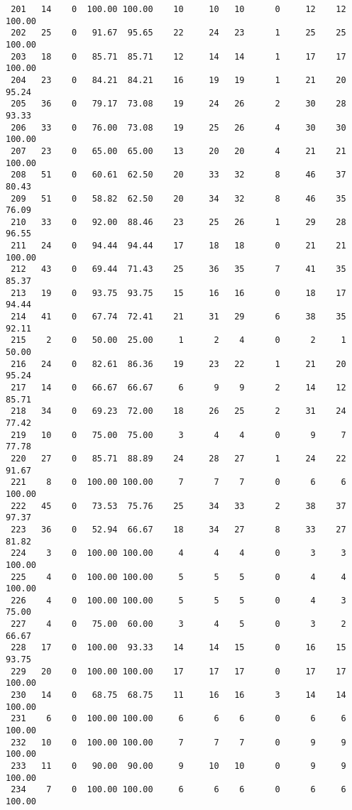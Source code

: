 \begin{verbatim}
 201   14    0  100.00 100.00    10     10   10      0     12    12   100.00
 202   25    0   91.67  95.65    22     24   23      1     25    25   100.00
 203   18    0   85.71  85.71    12     14   14      1     17    17   100.00
 204   23    0   84.21  84.21    16     19   19      1     21    20    95.24
 205   36    0   79.17  73.08    19     24   26      2     30    28    93.33
 206   33    0   76.00  73.08    19     25   26      4     30    30   100.00
 207   23    0   65.00  65.00    13     20   20      4     21    21   100.00
 208   51    0   60.61  62.50    20     33   32      8     46    37    80.43
 209   51    0   58.82  62.50    20     34   32      8     46    35    76.09
 210   33    0   92.00  88.46    23     25   26      1     29    28    96.55
 211   24    0   94.44  94.44    17     18   18      0     21    21   100.00
 212   43    0   69.44  71.43    25     36   35      7     41    35    85.37
 213   19    0   93.75  93.75    15     16   16      0     18    17    94.44
 214   41    0   67.74  72.41    21     31   29      6     38    35    92.11
 215    2    0   50.00  25.00     1      2    4      0      2     1    50.00
 216   24    0   82.61  86.36    19     23   22      1     21    20    95.24
 217   14    0   66.67  66.67     6      9    9      2     14    12    85.71
 218   34    0   69.23  72.00    18     26   25      2     31    24    77.42
 219   10    0   75.00  75.00     3      4    4      0      9     7    77.78
 220   27    0   85.71  88.89    24     28   27      1     24    22    91.67
 221    8    0  100.00 100.00     7      7    7      0      6     6   100.00
 222   45    0   73.53  75.76    25     34   33      2     38    37    97.37
 223   36    0   52.94  66.67    18     34   27      8     33    27    81.82
 224    3    0  100.00 100.00     4      4    4      0      3     3   100.00
 225    4    0  100.00 100.00     5      5    5      0      4     4   100.00
 226    4    0  100.00 100.00     5      5    5      0      4     3    75.00
 227    4    0   75.00  60.00     3      4    5      0      3     2    66.67
 228   17    0  100.00  93.33    14     14   15      0     16    15    93.75
 229   20    0  100.00 100.00    17     17   17      0     17    17   100.00
 230   14    0   68.75  68.75    11     16   16      3     14    14   100.00
 231    6    0  100.00 100.00     6      6    6      0      6     6   100.00
 232   10    0  100.00 100.00     7      7    7      0      9     9   100.00
 233   11    0   90.00  90.00     9     10   10      0      9     9   100.00
 234    7    0  100.00 100.00     6      6    6      0      6     6   100.00

\end{verbatim}
